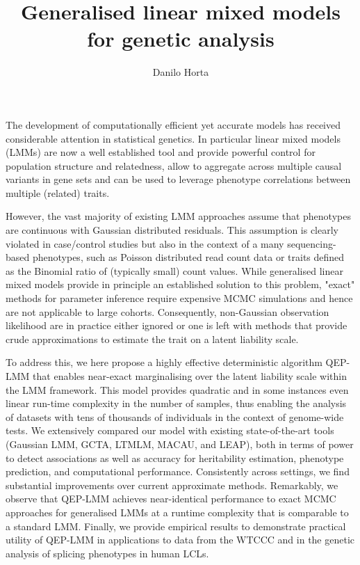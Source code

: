 \documentclass{TMarticle}
\author{Danilo Horta}
\title{Generalised linear mixed models for genetic analysis}
\begin{document}
\maketitle

The development of computationally efficient yet accurate models has received
considerable attention in statistical genetics. In particular linear mixed
models (LMMs) are now a well established tool and provide powerful control for
population structure and relatedness, allow to aggregate across multiple causal
variants in gene sets and can be used to leverage phenotype correlations between
multiple (related) traits.

However, the vast majority of existing LMM approaches assume that phenotypes
are continuous with Gaussian distributed residuals. This assumption is clearly
violated in case/control studies but also in the context of a many
sequencing-based phenotypes, such as Poisson distributed read count data or
traits defined as the Binomial ratio of (typically small) count values. While
generalised linear mixed models provide in principle an established solution to
this problem, "exact" methods for parameter inference require expensive MCMC
simulations and hence are not applicable to large cohorts. Consequently,
non-Gaussian observation likelihood are in practice either ignored or one is
left with methods that provide crude approximations to estimate the trait on a
latent liability scale.

To address this, we here propose a highly effective deterministic algorithm
QEP-LMM that enables near-exact marginalising over the latent liability scale
within the LMM framework. This model provides quadratic and in some instances
even linear run-time complexity in the number of samples, thus enabling the
analysis of datasets with tens of thousands of individuals in the context of
genome-wide tests. We extensively compared our model with existing
state-of-the-art tools (Gaussian LMM, GCTA, LTMLM, MACAU, and LEAP), both in
terms of power to detect associations as well as accuracy for heritability
estimation, phenotype prediction, and computational performance. Consistently
across settings, we find substantial improvements over current approximate
methods. Remarkably, we observe that QEP-LMM achieves near-identical performance
to exact MCMC approaches for generalised LMMs at a runtime complexity that is
comparable to a standard LMM. Finally, we provide empirical results to
demonstrate practical utility of QEP-LMM in applications to data from the WTCCC
and in the genetic analysis of splicing phenotypes in human LCLs.
\end{document}

